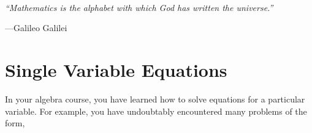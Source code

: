 


\vspace*{-0.2in} %
\noindent
{} 
\makebox[0.25\textwidth][l]{\hrulefill}\\[0.25cm]
\hfill 
{}\hfill
\makebox[0.25\textwidth][l]{ \texttt{\underline\coursename}}\hfill \\[0.25cm]
\makebox[0.65\textwidth]{}\hfill
\makebox[0.25\textwidth][l]{\enspace\texttt{\underline{\term\ \courseyear}}}\hfill 
\vspace{0.5in} %

\begin{centering}
\noindent\textbf{\Large \worksheetname} \\[0.1in]
\end{centering}
\vspace{0.1in}
\epigraph{\itshape``Mathematics is the alphabet with which God has written the universe.''}{---Galileo Galilei}
\qsp
\section*{Single Variable Equations}
In your algebra course, you have learned how to solve equations for a particular variable. For example, you have undoubtably encountered many problems of the form,  
\qsp

